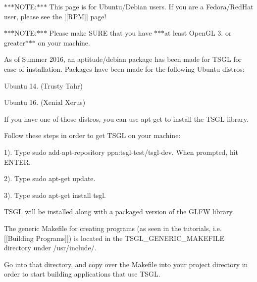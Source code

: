 $\ast$$\ast$$\ast$\-N\-O\-T\-E\-:$\ast$$\ast$$\ast$ This page is for Ubuntu/\-Debian users. If you are a Fedora/\-Red\-Hat user, please see the \mbox{[}\mbox{[}R\-P\-M\mbox{]}\mbox{]} page!

$\ast$$\ast$$\ast$\-N\-O\-T\-E\-:$\ast$$\ast$$\ast$ Please make S\-U\-R\-E that you have $\ast$$\ast$$\ast$at least Open\-G\-L 3. or greater$\ast$$\ast$$\ast$ on your machine.

As of Summer 2016, an aptitude/debian package has been made for T\-S\-G\-L for ease of installation. Packages have been made for the following Ubuntu distros\-:


\begin{DoxyItemize}
\item Ubuntu 14. (Trusty Tahr)
\item Ubuntu 16. (Xenial Xerus)
\end{DoxyItemize}

If you have one of those distros, you can use {\ttfamily apt-\/get} to install the T\-S\-G\-L library.

Follow these steps in order to get T\-S\-G\-L on your machine\-:

1). Type {\ttfamily sudo add-\/apt-\/repository ppa\-:tsgl-\/test/tsgl-\/dev}. When prompted, hit {\ttfamily E\-N\-T\-E\-R}.

2). Type {\ttfamily sudo apt-\/get update}.

3). Type {\ttfamily sudo apt-\/get install tsgl}.

T\-S\-G\-L will be installed along with a packaged version of the G\-L\-F\-W library.

The generic {\ttfamily Makefile} for creating programs (as seen in the tutorials, i.\-e. \mbox{[}\mbox{[}Building Programs\mbox{]}\mbox{]}) is located in the {\ttfamily T\-S\-G\-L\-\_\-\-G\-E\-N\-E\-R\-I\-C\-\_\-\-M\-A\-K\-E\-F\-I\-L\-E} directory under {\ttfamily /usr/include/}.

Go into that directory, and copy over the {\ttfamily Makefile} into your project directory in order to start building applications that use T\-S\-G\-L. 